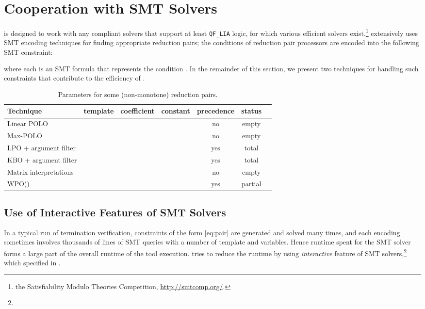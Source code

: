 \documentclass{llncs}
\newif\iffullversion
\begin{document}
\section{Cooperation with SMT Solvers}
\label{sec:SMT}

\NaTT is designed to work with any  compliant solvers
that support at least \texttt{QF\_LIA} logic,
for which various efficient solvers exist.\footnote{\Cf the Satisfiability Modulo Theories Competition, \url{http://smtcomp.org/}.}
\NaTT extensively uses SMT encoding techniques 
for finding appropriate reduction pairs;
the conditions of reduction pair processors are
encoded into the following SMT constraint:

where each  is an SMT formula
that represents the condition .
In the remainder of this section,
we present two techniques for handling such constraints that
contribute to the efficiency of \NaTT.

\begin{table}[tb]
\caption{\label{tab:parameters 2}Parameters for some (non-monotone) reduction pairs.}\iffullversion
\else
	\vspace{-1ex}\fi
\centering
\begin{tabular}{l@{\ }|cccccl}
	Technique	&template&coefficient&constant&precedence&status
\\	\hline
	Linear POLO
				&&		&	&no	&empty
\\	Max-POLO
				&	&		&	&no	&empty
\\	LPO + argument filter
				&&	&&yes&total
\\	KBO + argument filter
				&&	&	&yes&total
\\	Matrix interpretations
				&&&&no	&empty
\\	WPO()
				&	&	&	&yes&partial
\end{tabular}
\iffullversion
\else
	\vspace{-2ex}\fi
\end{table}
\subsection{Use of Interactive Features of SMT Solvers}
\label{sec:interactive}

In a typical run of termination verification,
constraints of the form \eqref{eq:pair} are generated and solved many times,
and each encoding sometimes involves thousands of lines of SMT queries
with a number of template and  variables.
Hence runtime spent for the SMT solver forms a large part of
the overall runtime of the tool execution.
\NaTT tries to reduce the runtime by using
\emph{interactive} feature of SMT solvers,\footnote{}
which  specified in .
\end{document}
